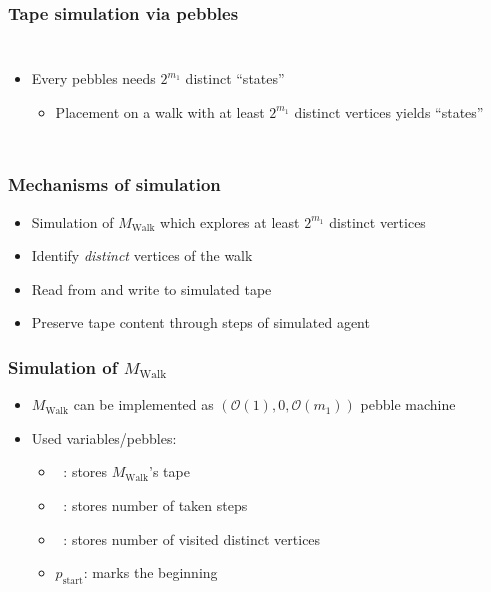 \documentclass{beamer}
\DeclareMathOperator{\Tid}{T_{\text{id}}}
\DeclareMathOperator{\Tsteps}{T_{\text{steps}}}
\DeclareMathOperator{\Twalk}{T_{\text{walk}}}
\begin{document}
\begin{frame}
  \frametitle{Tape simulation via pebbles}
  \begin{columns}
    \begin{itemize}
      \item Every pebbles needs $2^{m_{1}}$ distinct \enquote{states}
        \begin{itemize}
          \item Placement on a walk with at least $2^{m_{1}}$ distinct vertices
            yields \enquote{states}
        \end{itemize}
    \end{itemize}
  \end{columns}
\end{frame}

\begin{frame}
  \frametitle{Mechanisms of simulation}
  \begin{itemize}
    \item Simulation of $M_{\text{Walk}}$ which explores at least $2^{m_{1}}$
      distinct vertices
    \item Identify \emph{distinct} vertices of the walk
    \item Read from and write to simulated tape
    \item Preserve tape content through steps of simulated agent
  \end{itemize}
\end{frame}

\begin{frame}
  \frametitle{Simulation of $M_{\text{Walk}}$}
  \begin{itemize}
    \item $M_{\text{Walk}}$ can be implemented as
      $(\mathcal{O}(1), 0, \mathcal{O}(m_{1}))$ pebble machine
    \item Used variables/pebbles:
      \begin{itemize}
        \item $\Twalk$: stores $M_{\text{Walk}}$'s tape
        \item $\Tsteps$: stores number of taken steps
        \item $\Tid$: stores number of visited distinct vertices
        \item $p_{\text{start}}$: marks the beginning
      \end{itemize}
  \end{itemize}
\end{frame}
\end{document}
